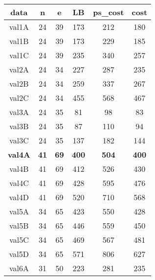 \documentclass[conference,compsoc]{IEEEtran}
\begin{document}
\begin{appendix}
\begin{table}[htbp]
\begin{center}
\begin{tabular}{@{}cccccc@{}}
\toprule
data           & n           & e           & LB           & ps\_cost     & cost         \\ \midrule
val1A          & 24          & 39          & 173          & 212          & 180          \\
val1B          & 24          & 39          & 173          & 229          & 185          \\
val1C          & 24          & 39          & 235          & 340          & 257          \\
val2A          & 24          & 34          & 227          & 287          & 235          \\
val2B          & 24          & 34          & 259          & 337          & 267          \\
val2C          & 24          & 34          & 455          & 568          & 467          \\
val3A          & 24          & 35          & 81           & 98           & 83           \\
val3B          & 24          & 35          & 87           & 110          & 94           \\
val3C          & 24          & 35          & 137          & 182          & 144          \\
\textbf{val4A} & \textbf{41} & \textbf{69} & \textbf{400} & \textbf{504} & \textbf{400} \\
val4B          & 41          & 69          & 412          & 526          & 430          \\
val4C          & 41          & 69          & 428          & 595          & 476          \\
val4D          & 41          & 69          & 520          & 710          & 568          \\
val5A          & 34          & 65          & 423          & 550          & 428          \\
val5B          & 34          & 65          & 446          & 559          & 450          \\
val5C          & 34          & 65          & 469          & 567          & 481          \\
val5D          & 34          & 65          & 571          & 806          & 627          \\
val6A          & 31          & 50          & 223          & 281          & 235          \\

\end{tabular}
\end{center}
\end{table}
\end{appendix}
\end{document}
